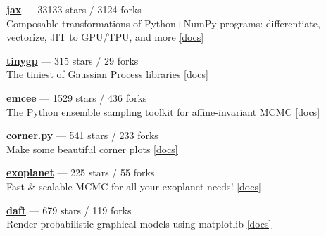 \item \href{https://github.com/jax-ml/jax}{{\bf jax}} --- 33133 stars / 3124 forks \\
Composable transformations of Python+NumPy programs: differentiate, vectorize, JIT to GPU/TPU, and more \href{https://docs.jax.dev}{[docs]}

\item \href{https://github.com/dfm/tinygp}{{\bf tinygp}} --- 315 stars / 29 forks \\
The tiniest of Gaussian Process libraries \href{https://tinygp.readthedocs.io}{[docs]}

\item \href{https://github.com/dfm/emcee}{{\bf emcee}} --- 1529 stars / 436 forks \\
The Python ensemble sampling toolkit for affine-invariant MCMC \href{https://emcee.readthedocs.io}{[docs]}

\item \href{https://github.com/dfm/corner.py}{{\bf corner.py}} --- 541 stars / 233 forks \\
Make some beautiful corner plots \href{http://corner.readthedocs.io}{[docs]}

\item \href{https://github.com/exoplanet-dev/exoplanet}{{\bf exoplanet}} --- 225 stars / 55 forks \\
Fast {\&} scalable MCMC for all your exoplanet needs!  \href{https://docs.exoplanet.codes}{[docs]}

\item \href{https://github.com/daft-dev/daft}{{\bf daft}} --- 679 stars / 119 forks \\
Render probabilistic graphical models using matplotlib \href{https://docs.daft-pgm.org}{[docs]}